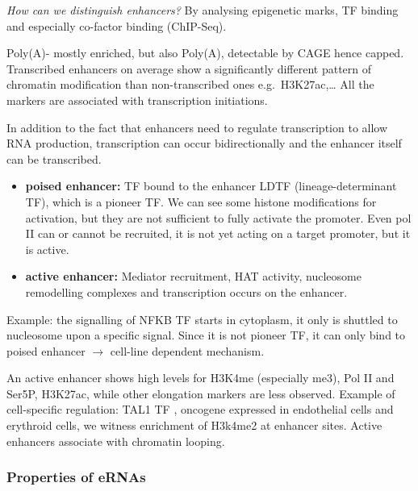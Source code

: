 \emph{How can we distinguish enhancers?} By analysing epigenetic marks, TF binding and especially co-factor binding (ChIP-Seq).

Poly(A)- mostly enriched, but also Poly(A), detectable by CAGE hence capped. Transcribed enhancers on average show a significantly different pattern of chromatin modification than non-transcribed ones e.g.~H3K27ac,\ldots{} All the markers are associated with transcription initiations.

In addition to the fact that enhancers need to regulate transcription to allow RNA production, transcription can occur bidirectionally and the enhancer itself can be transcribed.

\begin{itemize}
\tightlist
\item
  \textbf{poised enhancer:} TF bound to the enhancer LDTF (lineage-determinant TF), which is a pioneer TF. We can see some histone modifications for activation, but they are not sufficient to fully activate the promoter. Even pol II can or cannot be recruited, it is not yet acting on a target promoter, but it is active.
\item
  \textbf{active enhancer:} Mediator recruitment, HAT activity, nucleosome remodelling complexes and transcription occurs on the enhancer.
\end{itemize}

Example: the signalling of NFKB TF starts in cytoplasm, it only is shuttled to nucleosome upon a specific signal. Since it is not pioneer TF, it can only bind to poised enhancer $\rightarrow$ cell-line dependent mechanism.

An active enhancer shows high levels for H3K4me (especially me3), Pol II and Ser5P, H3K27ac, while other elongation markers are less observed. Example of cell-specific regulation: TAL1 TF , oncogene expressed in endothelial cells and erythroid cells, we witness enrichment of H3k4me2 at enhancer sites. Active enhancers associate with chromatin looping.

\hypertarget{properties-of-ernas}{%
\subsubsection{Properties of eRNAs}\label{properties-of-ernas}}

